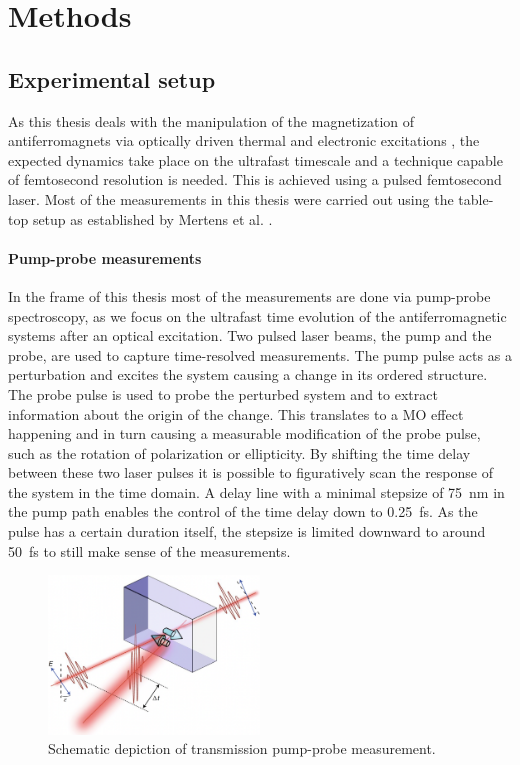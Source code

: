 \chapter{Methods}
\section{Experimental setup}
As this thesis deals with the manipulation of the magnetization of antiferromagnets via optically driven thermal and electronic excitations \cite{song_how_2018}, the expected dynamics take place on the ultrafast timescale and a technique capable of femtosecond resolution is needed.
This is achieved using a pulsed femtosecond laser.
Most of the measurements in this thesis were carried out using the table-top setup as established by Mertens et al. \cite{mertens_wide_2020}.

\subsubsection*{Pump-probe measurements}
In the frame of this thesis most of the measurements are done via pump-probe spectroscopy, as we focus on the ultrafast time evolution of the antiferromagnetic systems after an optical excitation.
Two pulsed laser beams, the pump and the probe, are used to capture time-resolved measurements.
The pump pulse acts as a perturbation and excites the system causing a change in its ordered structure.
The probe pulse is used to probe the perturbed system and to extract information about the origin of the change. 
This translates to a MO effect happening and in turn causing a measurable modification of the probe pulse, such as the rotation of polarization or ellipticity.
By shifting the time delay between these two laser pulses it is possible to figuratively scan the response of the system in the time domain.
A delay line with a minimal stepsize of \qty{75}{nm} in the pump path enables the control of the time delay down to \qty{0.25}{fs}.
As the pulse has a certain duration itself, the stepsize is limited downward to around \qty{50}{fs} to still make sense of the measurements.
\begin{figure}[ht]
    \centering
    \includegraphics[width=0.5\textwidth]{pictures/pump_probe.png}
    \caption{Schematic depiction of transmission pump-probe measurement.}
    \label{fig:pump_probe}
\end{figure}

